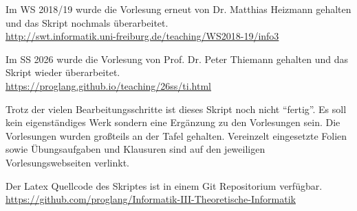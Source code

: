 \documentclass[11pt,paper=a4,titlepage,headsepline,ngerman,listof=totoc]{scrartcl}
\begin{document}
Im WS 2018/19 wurde die Vorlesung erneut von Dr. Matthias Heizmann gehalten und das Skript nochmals überarbeitet.\\
\url{http://swt.informatik.uni-freiburg.de/teaching/WS2018-19/info3}

Im SS 2026 wurde die Vorlesung von Prof. Dr. Peter Thiemann gehalten und das Skript wieder  überarbeitet.\\
\url{https://proglang.github.io/teaching/26ss/ti.html}

\smallskip

Trotz der vielen Bearbeitungsschritte ist dieses Skript noch nicht ``fertig''. Es soll kein eigenständiges Werk sondern eine Ergänzung zu den Vorlesungen sein.
Die Vorlesungen wurden großteils an der Tafel gehalten. Vereinzelt eingesetzte Folien sowie Übungsaufgaben und Klausuren sind auf den jeweiligen Vorlesungswebseiten verlinkt.

\smallskip

Der Latex Quellcode des Skriptes ist in einem Git Repositorium verfügbar.\\
\url{https://github.com/proglang/Informatik-III-Theoretische-Informatik}

\newpage

\vspace{\baselineskip}





% 
% 
% 

\iffalse
\printindex
\end{document}
